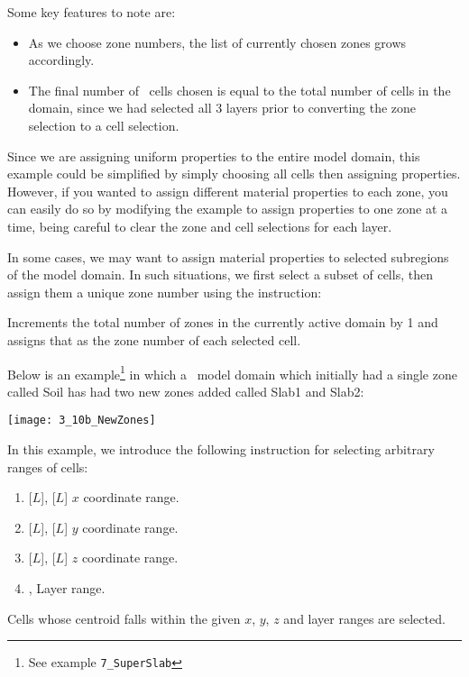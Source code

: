 {Some key features to note are:
\begin{itemize}
    \item As we choose zone numbers, the list of currently chosen zones grows accordingly.
    \item The final number of \gwf\ cells chosen is equal to the total number of cells in the domain, since we had selected all 3 layers prior to converting the  zone selection to a cell selection.
\end{itemize}
Since we are assigning uniform properties to the entire model domain, this example could be simplified by simply choosing all cells then assigning properties.  However, if you wanted to assign different material properties to each zone, you can easily do so by modifying the example to assign properties to one zone at a time, being careful to clear the zone and cell selections for each layer.

In some cases, we may want to assign material properties to selected subregions of the model domain.  In such situations, we first select a subset of cells, then assign them a unique zone number using the instruction:

    {Increments the total number of zones in the currently active domain by 1 and assigns that as the zone number of each selected cell.
     }

Below is an example\footnote{See example \texttt{7\_SuperSlab}} in which a \gwf\ model domain which initially had a single zone called {\sf Soil} has had two new zones added called {\sf Slab1} and {\sf Slab2}:

\texttt{[image: 3\_10b\_NewZones]}

In this example, we introduce the following instruction for selecting arbitrary ranges of cells:

    {
    \squish
    \begin{enumerate}
    \item {} [$L$], [$L$]  $x$ coordinate range.
    \item {} [$L$], [$L$]  $y$ coordinate range.
    \item {} [$L$], [$L$]  $z$ coordinate range.
    \item {},   Layer range.
    \end{enumerate}
    Cells whose centroid falls within the given $x$, $y$, $z$ and layer ranges are selected.
    }

}
